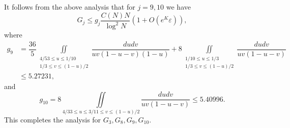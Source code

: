 \documentclass[12pt, a4paper]{amsart}
\def\le{\leqslant}
\theoremstyle{plain}
\theoremstyle{remark}
\numberwithin{equation}{section}
\begin{document}
It follows from the above analysis that for $j=9,10$ we have
\begin{equation}\label{G9-10}
G_j \le g_j \frac{C(N)N}{\log^2 N} (1+O(e^K\varepsilon)), 
\end{equation}
where 
\begin{equation}\label{g9}
\begin{aligned}
g_{9}&=\dfrac{36}{5}\iint\limits_{\substack{4/53\le u\le 1/10\\ 1/3\le v\le (1-u)/2}}\dfrac{dudv}{uv(1-u-v)(1-u)}+8\iint\limits_{\substack{1/10\le u\le 1/3\\ 1/3\le v\le (1-u)/2}}\dfrac{dudv}{uv(1-u-v)}\\
&\le 5.27231,
\end{aligned}
\end{equation}
and 
\begin{equation}\label{g10}
g_{10}=8\iint\limits_{4/33\le u\le 3/11\le v\le (1-u)/2}\dfrac{dudv}{uv(1-u-v)}
\le 5.40996. 
\end{equation}
This completes the analysis for $G_3,G_8,G_9,G_{10}$. 
\end{document}
